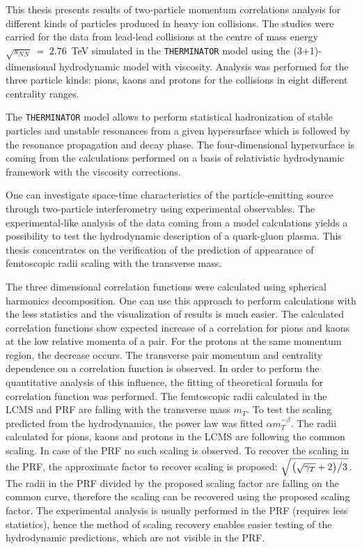 This thesis presents results of two-particle momentum correlations analysis for different kinds of particles produced in heavy ion collisions.
The studies were carried for the data from lead-lead collisions at the centre of mass energy $\sqrt{s_{NN}}~=~2.76$~TeV simulated in the \verb|THERMINATOR| model using the (3+1)-dimensional hydrodynamic model with viscosity.
Analysis was performed for the three particle kinds: pions, kaons and protons for the collisions in eight different centrality ranges.

The \verb|THERMINATOR| model allows to perform statistical hadronization of stable particles and unstable resonances from a given hypersurface which is followed by the resonance propagation and decay phase.
The four-dimensional hypersurface is coming from the calculations performed on a basis of relativistic hydrodynamic framework with the viscosity corrections.

One can investigate space-time characteristics of the particle-emitting source through two-particle interferometry using experimental observables.
The experimental-like analysis of the data coming from a model calculations yields a possibility to test the hydrodynamic description of a quark-gluon plasma.
This thesis concentrates on the verification of the prediction of appearance of femtoscopic radii scaling with the transverse mass.

The three dimensional correlation functions were calculated using spherical harmonics decomposition.
One can use this approach to perform calculations with the less statistics and the visualization of results is much easier.
The calculated correlation functions show expected increase of a correlation for pions and kaons at the low relative momenta of a pair.
For the protons at the same momentum region, the decrease occurs.
The transverse pair momentum and centrality dependence on a correlation function is observed.
In order to perform the quantitative analysis of this influence, the fitting of theoretical formula for correlation function was performed.
The femtoscopic radii calculated in the LCMS and PRF are falling with the transverse mass $m_T$.
To test the scaling predicted from the hydrodynamics, the power law was fitted $\alpha m_T^{-\beta}$.
The radii calculated for pions, kaons and protons in the LCMS are following the common scaling.
In case of the PRF no such scaling is observed.
To recover the scaling in the PRF, the approximate factor to recover scaling is proposed: $\sqrt{ \left. \left( \sqrt{\gamma_T} + 2 \right) \middle/ 3 \right. }$.
The radii in the PRF divided by the proposed scaling factor are falling on the common curve, therefore the scaling can be recovered using the proposed scaling factor.
The experimental analysis is usually performed in the PRF (requires less statistics), hence the method of scaling recovery enables easier testing of the hydrodynamic predictions, which are not visible in the PRF.
